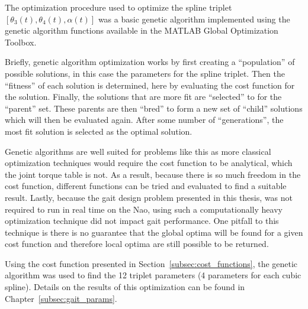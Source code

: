The optimization procedure used to optimize the spline triplet $[\theta_3(t), \theta_4(t), \alpha(t)]$
was a basic genetic algorithm implemented using the genetic algorithm functions available in the MATLAB 
Global Optimization Toolbox. 

Briefly, genetic algorithm optimization works by first creating a ``population'' of
possible solutions, in this case the parameters for the spline triplet. Then the ``fitness'' of each solution
is determined, here by evaluating the cost function for the solution. Finally, the solutions that are more fit
are ``selected'' to for the ``parent'' set. These parents are then ``bred'' to form a new set of ``child'' solutions
which will then be evaluated again. After some number of ``generations'', the most fit solution is selected
as the optimal solution.

Genetic algorithms are well suited for problems like this as more classical optimization techniques
would require the cost function to be analytical, which the joint torque table is not.
As a result, because there is so much freedom in the cost function, different functions can be tried
and evaluated to find a suitable result.
Lastly, because the gait design problem presented in this thesis, was not required to run in real time on the
Nao, using such a computationally heavy optimization technique did not impact gait performance.
One pitfall to this technique is there is no guarantee that the global optima will be found for
a given cost function and therefore local optima are still possible to be returned.

Using the cost function presented in Section~\ref{subsec:cost_functions}, the genetic algorithm was used
to find the 12 triplet parameters (4 parameters for each cubic spline). %
Details on the results of this optimization can be found in Chapter~\ref{subsec:gait_params}.
